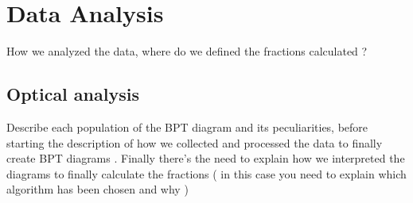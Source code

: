 \begin{comment}

3. **Area Coperta:**
   - Estensione dell'area del cielo coperta dal SDSS.
   - Dettagli sulla suddivisione dell'area (ad esempio, Northern e Southern Galactic Cap).

6. **Catalogo Galattico:**
   - Informazioni sulla componente galattica del catalogo.
   - Parametri inclusi per le galassie.

8. **Dati Spettrali:**
   - Presenza di dati spettrali nel SDSS.
   - Risoluzione spettrale e gamma di lunghezze d'onda coperte.

9. **Survey Data Releases:**
   - Divisione dei dati in "Data Releases" e principali miglioramenti/funzionalità introdotte in ciascuno.




1. **Introduzione al Catalogo C4:**
   - Breve presentazione del catalogo C4.
   - Contesto in cui è stato sviluppato.

2. **Origine del Catalogo:**
   - Motivazioni e scopi per cui è stato creato.
   - Data di pubblicazione e contesto scientifico.

3. **Selezione delle BCG:**
   - Criteri utilizzati per identificare le Brightest Cluster Galaxies (BCG).
   - Parametri considerati nella selezione.
   - Criteri per l'eliminazione dei doppioni (Opzionale)

4. **Parametri Inclusi per le BCG:**
   - Elenco dei parametri forniti per ciascuna BCG.
   - Possibili caratteristiche fotometriche e spettrali.

5. **Copertura del Cielo:**
   - Estensione dell'area del cielo coperta dal catalogo.
   - Suddivisione geografica, se pertinente.

6. **Risultati Chiave:**
   - Eventuali risultati scientifici ottenuti utilizzando il catalogo.
   - Contributi specifici alle conoscenze astronomiche.


8. **Accesso ai Dati:**
   - Aggiungere il riferimento alla bibliografia !!

\end{comment}
\newpage
\section{Data Analysis}
How we analyzed the data, where do we defined the fractions calculated ?
\subsection{Optical analysis}
Describe each population of the BPT diagram and its peculiarities, before starting the description of how we collected and processed the data to finally create BPT diagrams .
Finally there's the need to explain how we interpreted the diagrams to finally calculate the fractions ( in this case you need to explain which algorithm has been chosen and why ) 


